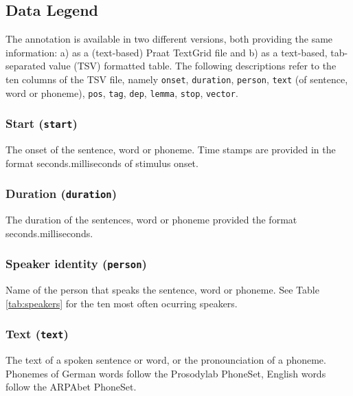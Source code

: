 \documentclass[10pt,a4paper,onecolumn]{article}
\begin{document}
\subsection*{Data Legend}
The annotation is available in two different versions, both providing the same information: a) as a (text-based) Praat TextGrid file and b) as a text-based, tab-separated value (TSV) formatted table.
The following descriptions refer to the ten columns of the TSV file, namely
\texttt{onset}, \texttt{duration}, \texttt{person}, \texttt{text} (of sentence, word or phoneme), \texttt{pos}, \texttt{tag}, \texttt{dep}, \texttt{lemma}, \texttt{stop}, \texttt{vector}.


\subsubsection*{Start (\texttt{start})}
The onset of the sentence, word or phoneme. Time stamps are provided in the format seconds.milliseconds of stimulus onset.


\subsubsection*{Duration (\texttt{duration})}
The duration of the sentences, word or phoneme provided the format seconds.milliseconds.


\subsubsection*{Speaker identity (\texttt{person})}
Name of the person that speaks the sentence, word or phoneme. See Table \ref{tab:speakers} for the ten most often ocurring speakers.


\subsubsection*{Text (\texttt{text})}
The text of a spoken sentence or word, or the pronounciation of a phoneme.
Phonemes of German words follow the Prosodylab PhoneSet, English words follow the ARPAbet PhoneSet.
\end{document}
